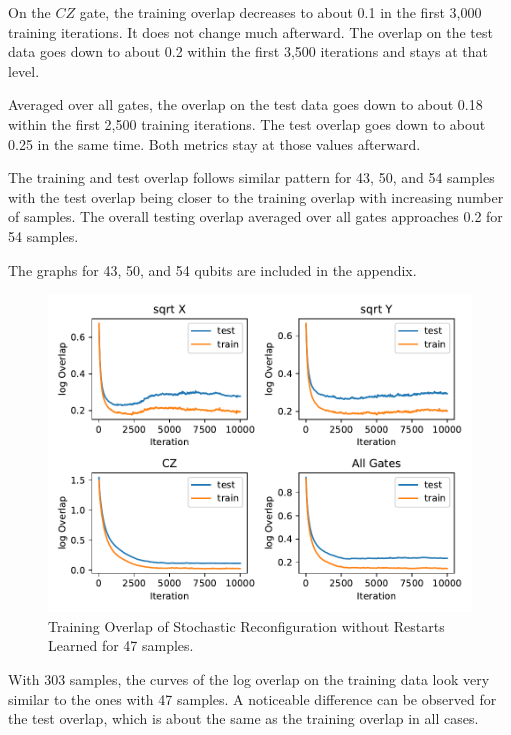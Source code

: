 On the $CZ$ gate, the training overlap decreases to about 0.1 in the first 3,000 training iterations. It does 
not change much afterward. The overlap on the test data goes down to about 0.2 within the first 3,500 iterations 
and stays at that level.

Averaged over all gates, the overlap on the test data goes down to about 0.18 within the first 2,500 training iterations. 
The test overlap goes down to about 0.25 in the same time. Both metrics stay at those values afterward.

The training and test overlap follows similar pattern for 43, 50, and 54 samples with the 
test overlap being closer to the training overlap with increasing number of samples. The overall
testing overlap averaged over all gates approaches 0.2 for 54 samples.

The graphs for 43, 50, and 54 qubits are included in the appendix.

\begin{figure}[H]
  \centering
  \includegraphics[width=\textwidth]{figures/results/SR-no-restarts-learned/avgOverlap_47.pdf}
  \caption[Training Overlap of Stochastic Reconfiguration without Restarts Learned]{Training 
  Overlap of Stochastic Reconfiguration without Restarts Learned for 47 samples.}
  \label{fig:sr_no_restarts_overlap_47}
\end{figure}

With 303 samples, the curves of the log overlap on the training data look very similar to the 
ones with 47 samples. A noticeable difference can be observed for the test overlap, which is 
about the same as the training overlap in all cases.

